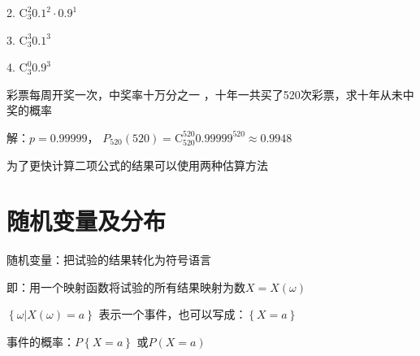 2. $\mathrm{C}_{3}^{2}0.1^2\cdot 0.9^{1}$ 

3. $\mathrm{C}_{3}^{3}0.1^3$ 

4. $\mathrm{C}_{3}^{0}0.9^{3}$
\begin{eg}
    彩票每周开奖一次，中奖率十万分之一 ，十年一共买了520次彩票，求十年从未中奖的概率
\end{eg}
解：$p=0.99999$， $P_{520}\left( 520 \right) =\mathrm{C}_{520}^{520}0.99999^{520}\approx 0.9948$ 
\begin{notation}
    为了更快计算二项公式的结果可以使用两种估算方法
\end{notation}

\section{随机变量及分布}%
\label{sec:随机变量及分布}
\begin{defi}
    随机变量：把试验的结果转化为符号语言

    即：用一个映射函数将试验的所有结果映射为数$X=X\left( \omega \right) $
\end{defi}
\begin{eg}
    $\left\{ \omega|X\left( \omega \right) =a \right\} $ 表示一个事件，也可以写成：$\left\{ X=a \right\} $ 

    事件的概率：$P\left\{ X=a \right\} $ 或$P\left( X=a \right) $
\end{eg}

